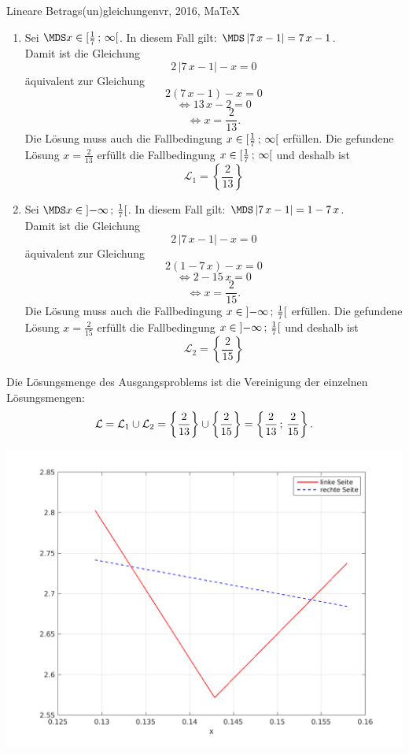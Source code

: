 \begin{MAufgabe}{Lineare Betrags(un)gleichungen}{vr, 2016, MaTeX}
 \begin{enumerate} 
 \item Sei $ \MDS x\in[ \frac{1}{7} \, \MIntvlSep \, \infty\MoIr $. 
 In diesem Fall gilt:  
  $ \MDS \left| 7\, x - 1\right|=7\, x - 1$. \\ 
 Damit ist die Gleichung 
 $$ 
2\, \left|7\, x - 1\right| - x= 0
$$
 \"aquivalent zur Gleichung
 $$ 
2\left(7\, x - 1\right)- x= 0 
$$  
$$ 
 \Leftrightarrow 13\, x - 2= 0 
$$  
$$ \Leftrightarrow x = \frac{2}{13} . 
 $$ 
 Die L\"osung muss auch die Fallbedingung $x\in [ \frac{1}{7} \, ; \, \infty[\mbox{}  $ erf\"ullen. Die gefundene L\"osung $x=\frac{2}{13}$ erf\"ullt die Fallbedingung  $x\in [ \frac{1}{7} \, ; \, \infty[\mbox{} $ und deshalb ist  $$
 \mathcal{L}_{1}=\left\{\frac{2}{13}\right\}
 $$ 
\item Sei $ \MDS x\in\MoIl  -\infty \, \MIntvlSep \, \frac{1}{7}\MoIr $. 
 In diesem Fall gilt:  
  $ \MDS \left| 7\, x - 1\right|=1 - 7\, x$. \\ 
 Damit ist die Gleichung 
 $$ 
2\, \left|7\, x - 1\right| - x= 0
$$
 \"aquivalent zur Gleichung
 $$ 
2\left(1 - 7\, x\right)- x= 0 
$$  
$$ 
 \Leftrightarrow 2 - 15\, x= 0 
$$  
$$ \Leftrightarrow x = \frac{2}{15} . 
 $$ 
 Die L\"osung muss auch die Fallbedingung $x\in \mbox{}]\mathopen{}  -\infty \, ; \, \frac{1}{7}[\mbox{}  $ erf\"ullen. Die gefundene L\"osung $x=\frac{2}{15}$ erf\"ullt die Fallbedingung  $x\in \mbox{}]\mathopen{}  -\infty \, ; \, \frac{1}{7}[\mbox{} $ und deshalb ist  $$
 \mathcal{L}_{2}=\left\{\frac{2}{15}\right\}
 $$ 
 \end{enumerate} 
  Die L\"osungsmenge des Ausgangsproblems ist die Vereinigung der einzelnen L\"osungsmengen: 
$$ \mathcal{L} = \mathcal{L}_{1} \cup \mathcal{L}_{2} 
 = \left\{\frac{2}{13}\right\}\cup \left\{\frac{2}{15}\right\} 
  = \left\{\frac{2}{13}\, ; \,\frac{2}{15}\right\} 
 . $$ 
 
 \begin{center}
 \includegraphics[width=0.8\linewidth]{Abb_zur_Ag_autogenerated_ineq_13.png} \end{center}
 
\else\relax\fi
 \end{MAufgabe}